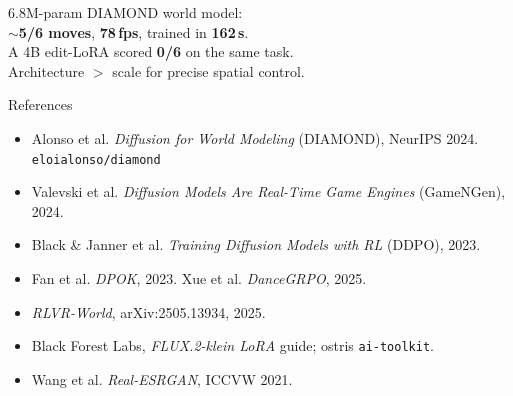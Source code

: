 \documentclass[aspectratio=169,11pt]{beamer}
\newcommand{\code}[1]{\texttt{\small #1}}
\begin{document}
\begin{frame}[standout]
  6.8M-param DIAMOND world model:\\
  \textbf{$\sim$5/6 moves}, \textbf{78\,fps}, trained in \textbf{162\,s}.\\[0.6em]
  \normalsize A 4B edit-LoRA scored \textbf{0/6} on the same task.\\
  Architecture $>$ scale for precise spatial control.
\end{frame}

\begin{frame}{References}
  \footnotesize
  \begin{itemize}
    \item Alonso et al. \emph{Diffusion for World Modeling} (DIAMOND), NeurIPS 2024. \code{eloialonso/diamond}
    \item Valevski et al. \emph{Diffusion Models Are Real-Time Game Engines} (GameNGen), 2024.
    \item Black \& Janner et al. \emph{Training Diffusion Models with RL} (DDPO), 2023.
    \item Fan et al. \emph{DPOK}, 2023. \quad Xue et al. \emph{DanceGRPO}, 2025.
    \item \emph{RLVR-World}, arXiv:2505.13934, 2025.
    \item Black Forest Labs, \emph{FLUX.2-klein LoRA} guide; ostris \code{ai-toolkit}.
    \item Wang et al. \emph{Real-ESRGAN}, ICCVW 2021.
  \end{itemize}
\end{frame}
\end{document}
